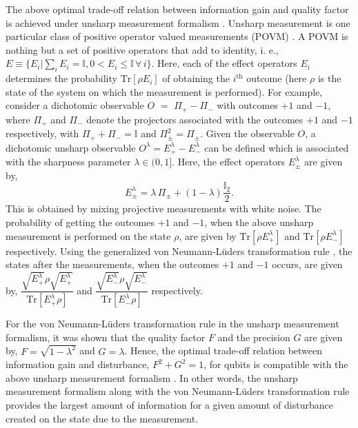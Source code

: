 \documentclass[pra,a4paper,aps,twocolumn,showpacs,superscriptaddress,groupedaddress]{revtex4}
\begin{document}
The above optimal trade-off relation between information gain and quality factor is achieved under unsharp measurement formalism \cite{majumdar,sas}. Unsharp measurement \cite{pb1,pb2} is one particular class of  positive operator valued measurements (POVM) \cite{pb1,pb2}. A POVM is nothing but a set of positive operators that add to identity, i. e.,  $E \equiv \{ E_i | \sum_i E_i = \mathbb{I}, 0 <E_i \leq \mathbb{I} \, \forall \, i \}$. Here, each of the effect operators $E_i$ determines the probability  $\text{Tr}[\rho E_{i}]$ of obtaining the $i^{\text{th}}$ outcome (here $\rho$ is the state of the system on which the measurement is performed). 
 For example, consider a dichotomic observable $O$ $=$ $\Pi_{+} - \Pi_{-}$ with outcomes $+1$ and $-1$, where $\Pi_{+}$ and $\Pi_{-}$ denote the projectors associated with the outcomes $+1$ and $-1$ respectively, with $\Pi_{+} +  \Pi_{-} = \mathbb{I}$ and $\Pi_{\pm}^2 = \Pi_{\pm}$. Given the observable $O$, a dichotomic unsharp observable  $O^{\lambda} = E^{\lambda}_+ - E^{\lambda}_-$ \cite{umn1,umn2} can be defined which is associated with the sharpness parameter $\lambda \in (0, 1]$. Here, the effect operators $E^{\lambda}_{\pm}$ are given by, 
\begin{equation}
E^\lambda_{\pm} = \lambda \, \Pi_{\pm} + (1-\lambda) \frac{\mathbb{I}_2}{2}.
\end{equation} 
This is obtained by mixing projective measurements with white noise. The probability of getting the outcomes $+1$ and $-1$, when the above unsharp measurement is performed on the state $\rho$, are given by $\text{Tr}[\rho E^\lambda_{+}]$ and $\text{Tr}[\rho E^\lambda_{-}]$ respectively. Using the generalized von Neumann-L\"{u}ders transformation rule \cite{pb1}, the states after the measurements, when the outcomes $+1$ and $-1$ occurs, are given by, $\dfrac{\sqrt{E^\lambda_{+}} \rho \sqrt{E^\lambda_{+}}}{\text{Tr}[E^\lambda_{+} \rho]}$ and $\dfrac{\sqrt{E^\lambda_{-}} \rho \sqrt{E^\lambda_{-}}}{\text{Tr}[E^\lambda_{-} \rho]}$ respectively. 

For the von Neumann-L\"{u}ders transformation rule in the  unsharp measurement formalism, it was shown \cite{majumdar} that the quality factor $F$ and the precision $G$ are given by, $F = \sqrt{1-\lambda^2}$ and $G = \lambda$. Hence, the optimal trade-off relation between information gain and disturbance, $F^2 + G^2 =1$, for qubits is compatible with the above unsharp measurement formalism \cite{majumdar,sas}. In other words, the unsharp measurement formalism along with the von Neumann-L\"{u}ders transformation rule provides the largest amount of information for a given amount of disturbance created on the state due to the measurement. 
\end{document}
